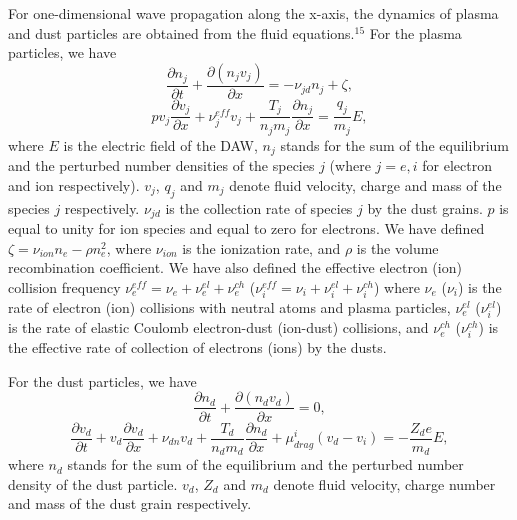 For one-dimensional wave propagation along the x-axis, the dynamics
of plasma and dust particles are obtained from the fluid
equations.$^{15}$ For the plasma particles, we have
\begin{equation}\label{1}
\frac{\partial n_j}{\partial t}+\frac{\partial(n_{j}v_{j})}{\partial x}=-\nu_{jd}n_{j}+\zeta,
\end{equation}
\begin{equation}\label{2}
p v_{j}\frac{\partial v_{j}}{\partial x}+\nu_{j}^{eff}v_{j}+\frac{T_{j}}{n_{j}m_{j}}
\frac{\partial n_{j}}{\partial x}=\frac{q_{j}}{m_{j}}E,
\end{equation}
where $E$ is the electric field of the DAW, $n_{j}$ stands for the
sum of the equilibrium and the perturbed number densities of the
species $j$ (where $j = e, i$ for electron and ion respectively).
$v_{j}$, $q_{j}$ and $m_{j}$ denote fluid velocity, charge and mass
of the species $j$ respectively. $\nu_{jd}$ is the collection rate
of species $j$ by the dust grains. $p$ is equal to unity for ion
species and equal to zero for electrons. We have defined
$\zeta=\nu_{ion}n_{e}-\rho n_{e}^2$, where $\nu_{ion}$ is the
ionization rate, and $\rho$ is the volume recombination coefficient.
We have also defined the effective electron (ion) collision
frequency $\nu_{e}^{eff}=\nu_{e}+\nu_{e}^{el}+\nu_{e}^{ch}$
($\nu_{i}^{eff}=\nu_{i}+\nu_{i}^{el}+\nu_{i}^{ch}$) where $\nu_{e}$
($\nu_{i}$) is the rate of electron (ion) collisions with neutral
atoms and plasma particles, $\nu_{e}^{el}$ ($\nu_{i}^{el}$) is the
rate of elastic Coulomb electron-dust (ion-dust) collisions, and
$\nu_{e}^{ch}$ ($\nu_{i}^{ch}$) is the effective rate of collection
of electrons (ions) by the dusts.

For the dust particles, we have
\begin{equation}\label{3}
\frac{\partial n_d}{\partial t}+\frac{\partial(n_{d}v_{d})}{\partial x}=0,
\end{equation}
\begin{equation}\label{4}
\frac{\partial v_{d}}{\partial t}+v_{d}\frac{\partial v_{d}}{\partial x}
+\nu_{dn}v_{d}+\frac{T_{d}}{n_{d}m_{d}}\frac{\partial n_{d}}{\partial x}
+\mu_{drag}^{i}(v_{d}-v_{i})=-\frac{Z_{d}e}{m_{d}}E,
\end{equation}
where $n_{d}$ stands for the sum of the equilibrium and the
perturbed number density of the dust particle. $v_{d}$, $Z_{d}$ and
$m_{d}$ denote fluid velocity, charge number and mass of the dust
grain respectively.

